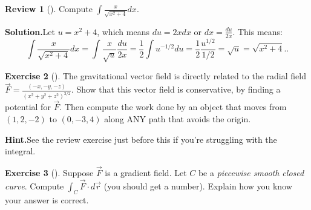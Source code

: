 \documentclass[10pt,]{book}
\theoremstyle{plain}
\theoremstyle{definition}
\theoremstyle{definition}
\theoremstyle{definition}
\newtheorem{project}{Review}[section]
\theoremstyle{definition}
\newtheorem{exploration}[project]{Exercise}
\theoremstyle{definition}
\numberwithin{equation}{section}
\newcommand{\ds}{\displaystyle}
\begin{document}
\begin{project}[]\label{project-21}
Compute \(\ds \int \frac{x}{\sqrt{x^2+4}}dx\).%
\par\medskip\noindent%
\textbf{Solution.}\quad Let \(u=x^2+4\), which means \(du=2xdx\) or \(dx=\frac{du}{2x}\).  This means:%
\begin{equation*}
\ds \int \frac{x}{\sqrt{x^2+4}}dx 
= \int \frac{x}{\sqrt{u}}\frac{du}{2x} 
= \frac{1}{2}\int u^{-1/2}du
= \frac{1}{2}\frac{u^{1/2}}{1/2}
= \sqrt{u} = \sqrt{x^2+4}.\text{.}
\end{equation*}
%
\end{project}
\begin{exploration}[]\label{exploration-208}
The gravitational vector field is directly related to the radial field \(\ds\vec F = \frac{\left(-x,-y,-z\right)}{(x^2+y^2+z^2)^{3/2}}\). Show that this vector field is conservative, by finding a potential for \(\vec F\). Then compute the work done by an object that moves from \((1,2,-2)\) to \((0,-3,4)\) along ANY path that avoids the origin.%
\par\medskip\noindent%
\textbf{Hint.}\quad See the review exercise just before this if you're struggling with the integral.%
\end{exploration}
\begin{exploration}[]\label{exploration-209}
Suppose \(\vec F\) is a gradient field. Let \(C\) be a \emph{piecewise smooth closed curve}. Compute \(\int_C \vec F\cdot d\vec r\) (you should get a number). Explain how you know your answer is correct.%
\end{exploration}
\typeout{************************************************}
\typeout{************************************************}
\end{document}

